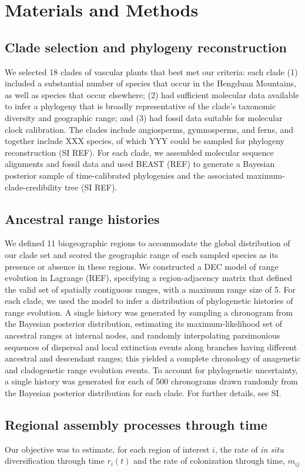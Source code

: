 \section{Materials and Methods}

\subsection{Clade selection and phylogeny reconstruction}

We selected 18 clades of vascular plants that best met our criteria: each clade (1) included a substantial number of species that occur in the Hengduan Mountains, as well as species that occur elsewhere; (2) had sufficient molecular data available to infer a phylogeny that is broadly representative of the clade's taxonomic diversity and geographic range; and (3) had fossil data suitable for molecular clock calibration. The clades include angiosperms, gymnosperms, and ferns, and together include XXX species, of which YYY could be sampled for phylogeny reconstruction (SI REF). For each clade, we assembled molecular sequence alignments and fossil data and used BEAST (REF) to generate a Bayesian posterior sample of time-calibrated phylogenies and the associated maximum-clade-credibility tree (SI REF).

\subsection{Ancestral range histories}

We defined 11 biogeographic regions to accommodate the global distribution of our clade set and scored the geographic range of each sampled species as its presence or absence in these regions. We constructed a DEC model of range evolution in Lagrange (REF), specifying a region-adjacency matrix that defined the valid set of spatially contiguous ranges, with a maximum range size of 5. For each clade, we used the model to infer a distribution of phylogenetic histories of range evolution. A single history was generated by sampling a chronogram from the Bayesian posterior distribution, estimating its maximum-likelihood set of ancestral ranges at internal nodes, and randomly interpolating parsimonious sequences of dispersal and local extinction events along branches having different ancestral and descendant ranges; this yielded a complete chronology of anagenetic and cladogenetic range evolution events. To account for phylogenetic uncertainty, a single history was generated for each of 500 chronograms drawn randomly from the Bayesian posterior distribution for each clade. For further details, see SI.

\subsection{Regional assembly processes through time}

Our objective was to estimate, for each region of interest $i$, the rate of \textit{in situ} diversification through time $r_i(t)$ and the rate of colonization through time, $m_{ij}$